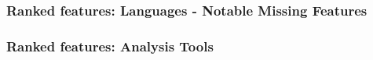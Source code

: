 
\begin{frame}[fragile]
\frametitle{Ranked features: Languages - Notable Missing Features}

\end{frame}



\begin{frame}
\frametitle{Ranked features: Analysis Tools}

\end{frame}



